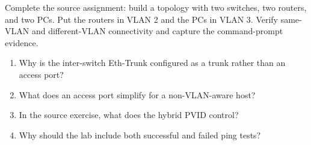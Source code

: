 \begin{tryit}
Complete the source assignment: build a topology with two switches, two routers, and two PCs. Put the routers in VLAN 2 and the PCs in VLAN 3. Verify same-VLAN and different-VLAN connectivity and capture the command-prompt evidence.
\end{tryit}

\begin{quickcheck}
\begin{enumerate}
\item Why is the inter-switch Eth-Trunk configured as a trunk rather than an access port?
\item What does an access port simplify for a non-VLAN-aware host?
\item In the source exercise, what does the hybrid PVID control?
\item Why should the lab include both successful and failed ping tests?
\end{enumerate}
\end{quickcheck}
